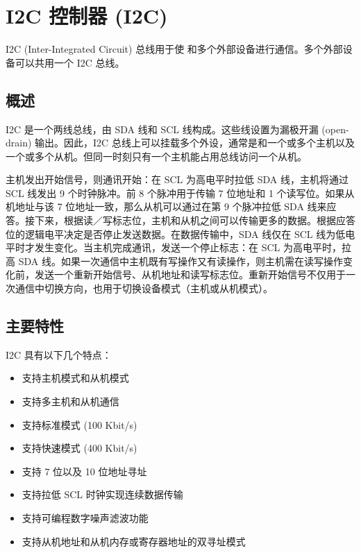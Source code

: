 \documentclass[main\_\_CN.tex]{subfiles}
\begin{document}

\ifglobal
\else
    {\let\clearpage\relax \listoftodos}
    \tableofcontents
\fi



\hypertarget{i2c}{}
\chapter{I2C 控制器 (I2C)}
\label{mod:i2c}



I2C (Inter-Integrated Circuit) 总线用于使 \chipname{} 和多个外部设备进行通信。多个外部设备可以共用一个 I2C 总线。


\section{概述}
I2C 是一个两线总线，由 SDA 线和 SCL 线构成。这些线设置为漏极开漏 (open-drain) 输出。因此，I2C 总线上可以挂载多个外设，通常是和一个或多个主机以及一个或多个从机。但同一时刻只有一个主机能占用总线访问一个从机。

主机发出开始信号，则通讯开始：在 SCL 为高电平时拉低 SDA 线，主机将通过 SCL 线发出 9 个时钟脉冲。前 8 个脉冲用于传输 7 位地址和 1 个读写位。如果从机地址与该 7 位地址一致，那么从机可以通过在第 9 个脉冲拉低 SDA 线来应答。接下来，根据读／写标志位，主机和从机之间可以传输更多的数据。根据应答位的逻辑电平决定是否停止发送数据。在数据传输中，SDA 线仅在 SCL 线为低电平时才发生变化。当主机完成通讯，发送一个停止标志：在 SCL 为高电平时，拉高 SDA 线。如果一次通信中主机既有写操作又有读操作，则主机需在读写操作变化前，发送一个重新开始信号、从机地址和读写标志位。重新开始信号不仅用于一次通信中切换方向，也用于切换设备模式（主机或从机模式）。

\section{主要特性}

I2C 具有以下几个特点：

\begin{itemize}
    \item 支持主机模式和从机模式
    \item 支持多主机和从机通信
    \item 支持标准模式 (100 Kbit/s)
    \item 支持快速模式 (400 Kbit/s)
    \item 支持 7 位以及 10 位地址寻址
    \item 支持拉低 SCL 时钟实现连续数据传输
    \item 支持可编程数字噪声滤波功能
    \item 支持从机地址和从机内存或寄存器地址的双寻址模式
\end{itemize}
\end{document}
